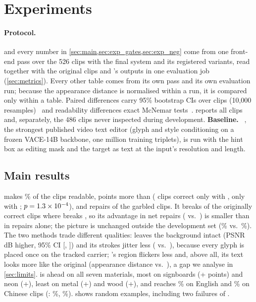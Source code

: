 \section{Experiments}
\label{sec:exp}

\paragraph{Protocol.}  and every number in \cref{sec:main,sec:exp_gates,sec:exp_neg} come from one front-end pass over the 526 clips with the final system and its registered variants, read together with the original clips and \steer's outputs in one evaluation job (\cref{sec:metrics}). Every other table comes from its own pass and its own evaluation run; because the appearance distance is normalised within a run, it is compared only within a table. Paired differences carry 95\% bootstrap CIs over clips (10{,}000 resamples)~\cite{efron1994bootstrap} and readability differences exact McNemar tests~\cite{mcnemar1947}.  reports all clips and, separately, the 486 clips never inspected during development. \textbf{Baseline.} \steer~\cite{zeng2026steervte}, the strongest published video text editor (glyph and style conditioning on a frozen VACE-14B backbone, one million training triplets), is run with the hint box as editing mask and the target as text at the input's resolution and length.



\subsection{Main results}
\label{sec:main}
\method makes \rOursRead\% of the clips readable, \rReadGain{} points more than \steer (\rOnlyOurs{} clips correct only with \method, \rOnlySteer{} only with \steer; $p=1.3\times10^{-4}$), and repairs \rOursFixed{} of the \rGarbled{} garbled clips. It breaks \rOursBroken{} of the \rOrigCorrect{} originally correct clips where \steer breaks \rSteerBroken, so its advantage in net repairs (\rOursNet{} vs.\ \rSteerNet) is smaller than in repairs alone; the picture is unchanged outside the development set (\rOursReadND\% vs.\ \rSteerReadND\%). The two methods trade different qualities: \method leaves the background intact (PSNR \rBGDiff\,dB higher, 95\% CI [\rBGDiffLo, \rBGDiffHi]) and its strokes jitter less (\rOursJitter{} vs.\ \rSteerJitter), because every glyph is placed once on the tracked carrier; \steer's region flickers less and, above all, its text looks more like the original (appearance distance \rSteerMad{} vs.\ \rOursMad), a gap we analyse in \cref{sec:limits}. \method is ahead on all seven materials, most on signboards (+\rGainSignboard{} points) and neon (+\rGainNeon), least on metal (+\rGainMetal) and wood (+\rGainWood), and reaches \rOursEn\% on English and \rOursZh\% on Chinese clips (\steer: \rSteerEn\%, \rSteerZh\%).  shows random examples, including two failures of \method.

